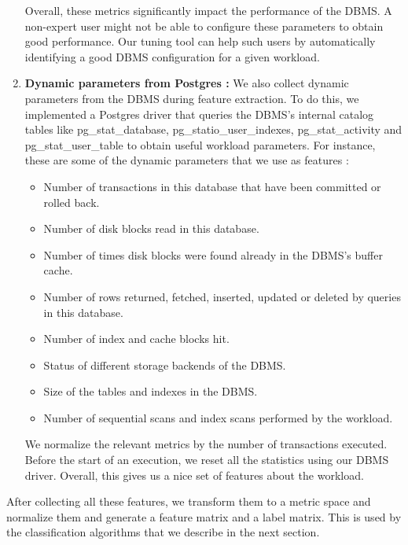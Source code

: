 \begin{enumerate}
{  Overall, these metrics significantly impact the performance of the DBMS. A
  non-expert user might not be able to configure these parameters to obtain
  good performance. Our tuning tool can help such users by automatically
  identifying a good DBMS configuration for a given workload.  
  }
  
  \item {\textbf{Dynamic parameters from Postgres :}
  We also collect dynamic parameters from the DBMS during feature extraction.
  To do this, we implemented a Postgres driver that queries the DBMS's internal
  catalog tables like pg\_stat\_database, pg\_statio\_user\_indexes,
  pg\_stat\_activity and pg\_stat\_user\_table
  to obtain useful workload parameters. For instance, these are some of the
  dynamic parameters that we use as features :\\
  
  \begin{itemize}    
    \item {Number of transactions in this database that have been committed or
    rolled back.}
    \item {Number of disk blocks read in this database.}
    \item {Number of times disk blocks were found already in the DBMS's buffer
    cache.}
    \item {Number of rows returned, fetched, inserted, updated or deleted by
    queries in this database.}
    \item {Number of index and cache blocks hit.}
    \item {Status of different storage backends of the DBMS.}
    \item {Size of the tables and indexes in the DBMS.}
    \item {Number of sequential scans and index scans performed by the
    workload.}
  \end{itemize}
  
  	We normalize the relevant metrics by the number of transactions executed.
  	Before the start of an execution, we reset all the statistics using our
  	DBMS driver. Overall, this gives us a nice set of features about the
  	workload. }
\end{enumerate}

After collecting all these features, we transform them to a metric space and
normalize them and generate a feature matrix and a label matrix. This is 
used by the classification algorithms that we describe in the next section.
